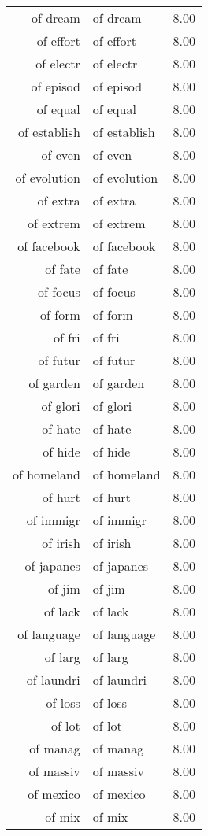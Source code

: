 \begin{table}[ht]
\begin{tabular}{rlr}
  of dream & of dream & 8.00 \\ 
  of effort & of effort & 8.00 \\ 
  of electr & of electr & 8.00 \\ 
  of episod & of episod & 8.00 \\ 
  of equal & of equal & 8.00 \\ 
  of establish & of establish & 8.00 \\ 
  of even & of even & 8.00 \\ 
  of evolution & of evolution & 8.00 \\ 
  of extra & of extra & 8.00 \\ 
  of extrem & of extrem & 8.00 \\ 
  of facebook & of facebook & 8.00 \\ 
  of fate & of fate & 8.00 \\ 
  of focus & of focus & 8.00 \\ 
  of form & of form & 8.00 \\ 
  of fri & of fri & 8.00 \\ 
  of futur & of futur & 8.00 \\ 
  of garden & of garden & 8.00 \\ 
  of glori & of glori & 8.00 \\ 
  of hate & of hate & 8.00 \\ 
  of hide & of hide & 8.00 \\ 
  of homeland & of homeland & 8.00 \\ 
  of hurt & of hurt & 8.00 \\ 
  of immigr & of immigr & 8.00 \\ 
  of irish & of irish & 8.00 \\ 
  of japanes & of japanes & 8.00 \\ 
  of jim & of jim & 8.00 \\ 
  of lack & of lack & 8.00 \\ 
  of language & of language & 8.00 \\ 
  of larg & of larg & 8.00 \\ 
  of laundri & of laundri & 8.00 \\ 
  of loss & of loss & 8.00 \\ 
  of lot & of lot & 8.00 \\ 
  of manag & of manag & 8.00 \\ 
  of massiv & of massiv & 8.00 \\ 
  of mexico & of mexico & 8.00 \\ 
  of mix & of mix & 8.00 \\ 

\end{tabular}
\end{table}
